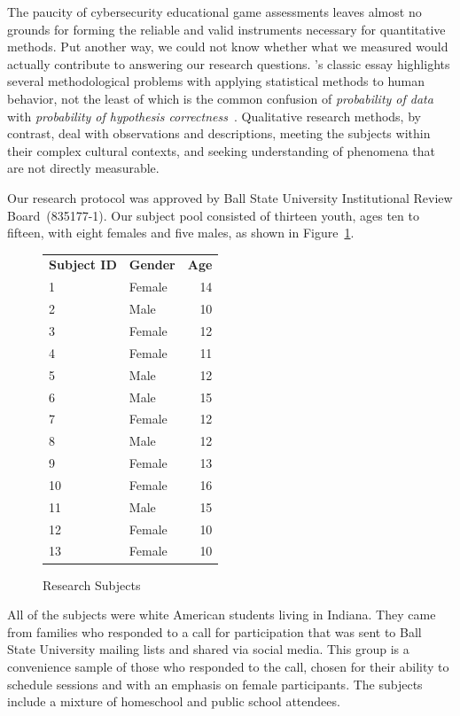 \documentclass[letterpaper]{article}
\begin{document}
The
paucity of cybersecurity educational game assessments leaves almost no
grounds for forming the reliable and valid instruments necessary for
quantitative methods.
 Put another way, we could not know whether what
we measured would actually contribute to answering our research
questions.  \citeauthor{Cohen1994}'s classic essay highlights several
methodological problems with applying statistical methods to human
behavior, not the least of which is the common confusion of
\textit{probability of data} with \textit{probability of hypothesis
  correctness}~\citep{Cohen1994}.
Qualitative research methods, by contrast, deal with 
observations and descriptions, meeting the subjects within their
complex cultural contexts, and seeking understanding of phenomena
that are not directly measurable. 

Our research protocol was approved by Ball State University
Institutional Review Board~(835177-1). 
Our subject pool consisted of thirteen youth, ages ten to fifteen,
with eight females and five males, as shown in Figure~\ref{fig:subjects}.
%
\begin{figure}
\begin{framed}
\centering
\begin{tabular}{llr}
\textbf{Subject ID} & \textbf{Gender} & \textbf{Age}\\
1 & Female & 14\\
2 & Male & 10\\
3 & Female & 12\\
4 & Female & 11\\
5 & Male & 12\\
6 & Male & 15\\
7 & Female & 12\\
8 & Male & 12\\
9 & Female & 13\\
10 & Female & 16\\
11 & Male & 15\\
12 & Female & 10\\
13 & Female & 10\\
\end{tabular}
\caption{Research Subjects}
\label{fig:subjects}
\end{framed}
\end{figure}
%
All of the subjects were
white American students living in Indiana. 
They came from families who responded to a call for participation that
was sent to Ball State University mailing lists and shared via social
media. This group is a convenience sample of those who responded to the
call, chosen for their ability to schedule sessions and with an emphasis
on female participants. The subjects include a mixture of homeschool
and public school attendees.
\end{document}
